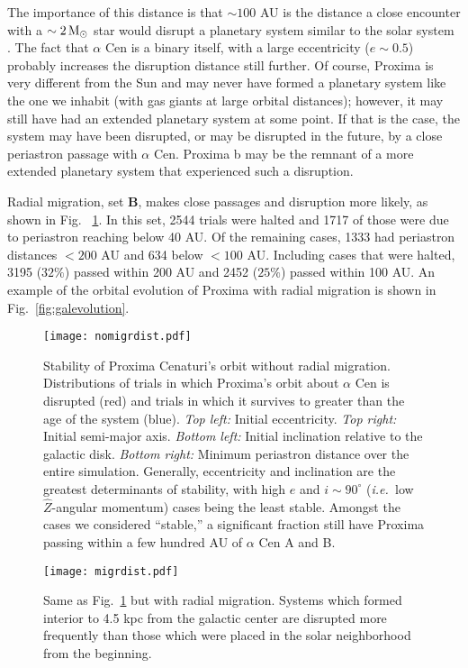 \documentclass[preprint,12pt]{aastex}
\def\msun{{\rm\,M_\odot}}
\def\ie{{\it i.e.\ }}
\begin{document}
The importance of this distance is that $\sim 100$ AU is the distance a close
encounter with a $\sim 2\msun$ star would disrupt a planetary system
similar to the solar system \citep{Kaib13}. The fact that $\alpha$ Cen
is a binary itself, with a large eccentricity ($e \sim 0.5$) probably
increases the disruption distance still further.  Of course, Proxima
is very different from the Sun and may never have formed a planetary
system like the one we inhabit (with gas giants at large orbital
distances); however, it may still have had an extended planetary
system at some point. If that is the case, the system may have been
disrupted, or may be disrupted in the future, by a close periastron
passage with $\alpha$ Cen. Proxima b may be the remnant of a more
extended planetary system that experienced such a disruption.

Radial migration, set \textbf{B}, makes close passages and disruption
more likely, as shown in Fig.~ \ref{fig:galacdist}. In this set, 2544
trials were halted and 1717 of those were due to periastron reaching
below 40 AU. Of the remaining cases, 1333 had periastron distances $<
200$ AU and 634 below $<100$ AU. Including cases that were halted,
3195 ($32\%$) passed within 200 AU and 2452 ($25\%$) passed within 100
AU.  An example of the orbital evolution of Proxima with radial
migration is shown in Fig.~\ref{fig:galevolution}.

\begin{figure}
\texttt{[image: nomigrdist.pdf]}
\caption{Stability of Proxima Cenaturi's orbit without radial
  migration. Distributions of trials in which Proxima's orbit about
  $\alpha$ Cen is disrupted (red) and trials in which it survives to
  greater than the age of the system (blue). {\it Top left:} Initial
  eccentricity. {\it Top right:} Initial semi-major axis. {\it Bottom
    left:} Initial inclination relative to the galactic disk. {\it
    Bottom right:} Minimum periastron distance over the entire
  simulation. Generally, eccentricity and inclination are the greatest
  determinants of stability, with high $e$ and $i \sim 90^{\circ}$
  (\ie low $\hat{Z}$-angular momentum) cases being the least stable.
  Amongst the cases we considered ``stable,'' a significant fraction
  still have Proxima passing within a few hundred AU of $\alpha$ Cen A
  and B.}
\label{fig:galacdist}
\end{figure}

\begin{figure}
\texttt{[image: migrdist.pdf]}
\caption{Same as Fig.~\ref{fig:galacdist} but with radial migration.
  Systems which formed interior to 4.5 kpc from the galactic center
  are disrupted more frequently than
  those which were placed in the solar neighborhood from the
  beginning. }
\label{fig:galacdistmigr}
\end{figure}
\end{document}
